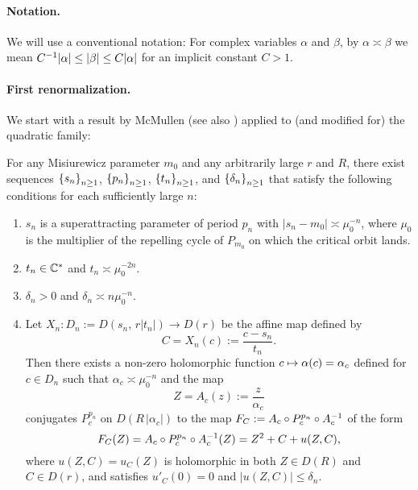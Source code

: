 \paragraph{\bf Notation. }
We will use a conventional notation: For complex variables $\alpha$ and $\beta$,
by $\alpha \asymp \beta$ we mean $C^{-1}|\alpha| \le |\beta| \le C|\alpha|$ for an implicit constant $C>1$. 

\paragraph{\bf First renormalization.}
We start with a result by McMullen \cite[Theorem 3.1]{McMullen 2000}
(see also \cite[Chapter V]{Douady-Hubbard 1985})
applied to (and modified for) the quadratic family:

\begin{lem}
\label{lem_cascade}
For any Misiurewicz parameter $m_0$ 
and any arbitrarily large $r$ and $R$, 
there exist sequences 
${\left\{ s_n \right\}}_{n \ge 1}$, 
${\left\{ p_n \right\}}_{n \ge 1}$,
${\left\{ t_n \right\}}_{n \ge 1}$, 
and ${\left\{ \delta_n \right\}}_{n \ge 1}$
that satisfy the following conditions for each sufficiently large $n$: 
\begin{enumerate}[\rm (a)]
\item
$s_n$ is a superattracting parameter of period $p_n$ 
with $|s_n -m_0| \asymp \mu_0^{-n}$, 
where $\mu_0$ is the multiplier
of the repelling cycle of $P_{m_0}$ 
on which the critical orbit lands.
\item 
$t_n \in \mathbb C^\ast$ and $t_n \asymp \mu_0^{-2n}$.
\item 
$\delta_n>0$ and $\delta_n \asymp n \mu_0^{-n}$.
\item
Let $X_n:D_n:=D(s_n,\, r |t_n|) \to D(r)$ be the affine map 
defined by 
$$
C=X_n(c):= \frac{c-s_n}{t_n}.
$$
Then there exists a non-zero holomorphic function 
$c \mapsto \alpha(c)=\alpha_c$
defined for $c \in D_n$ such that $\alpha_c \asymp \mu_0^{-n}$ 
and the map
$$
Z = A_c(z) :=\frac{z}{\alpha_c}
$$
conjugates $P_c^{p_n}$ on $D(R \,|\alpha_c|)$ to 
the map $F_{C}:=A_c \circ P_c^{p_n}\circ A_c^{-1}$
of the form
\begin{equation}
F_{C}(Z) 
 = A_c \circ P_c^{p_n} \circ A_c^{-1}(Z)
=Z^2 + C + u(Z,C),
\label{eq_F_C}
\end{equation}
where $u(Z,C) = u_C(Z)$ 
is holomorphic in both $Z \in  D(R)$ and $C \in D(r)$,
and satisfies $u'_C(0) = 0$ and $|u(Z,C)| \le \delta_n$.
\end{enumerate} 
\end{lem}


